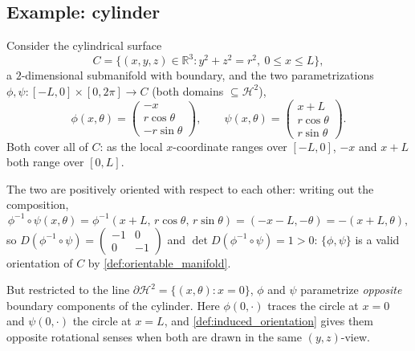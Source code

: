 \subsection{Example: cylinder}
\label{sec:cylinder_orientation_example}

Consider the cylindrical surface
\[C = \{(x,y,z) \in \mathbb{R}^3 : y^2+z^2 = r^2,\ 0\leq x\leq L\},\]
a $2$-dimensional submanifold with boundary, and the two parametrizations $\phi,\psi :
[-L,0]\times[0,2\pi] \to C$ (both domains $\subseteq \mathcal{H}^2$),
\[\phi(x,\theta) = \begin{pmatrix} -x \\ r\cos\theta \\ -r\sin\theta \end{pmatrix}, \qquad
  \psi(x,\theta) = \begin{pmatrix} x+L \\ r\cos\theta \\ r\sin\theta \end{pmatrix}.\]
Both cover all of $C$: as the local $x$-coordinate ranges over $[-L,0]$, $-x$ and $x+L$ both
range over $[0,L]$.

The two are positively oriented with respect to each other: writing out the composition,
\[\phi^{-1}\circ\psi(x,\theta) = \phi^{-1}(x+L,\,r\cos\theta,\,r\sin\theta) = (-x-L,-\theta)
  = -(x+L,\theta),\]
so $D(\phi^{-1}\circ\psi) = \begin{pmatrix}-1&0\\0&-1\end{pmatrix}$ and $\det D(\phi^{-1}
\circ\psi) = 1 > 0$: $\{\phi,\psi\}$ is a valid orientation of $C$ by
\cref{def:orientable_manifold}.

But restricted to the line $\partial\mathcal{H}^2 = \{(x,\theta) : x=0\}$, $\phi$ and $\psi$
parametrize \emph{opposite} boundary components of the cylinder. Here $\phi(0,\cdot)$ traces the
circle at $x=0$ and $\psi(0,\cdot)$ the circle at $x=L$, and \cref{def:induced_orientation}
gives them opposite rotational senses when both are drawn in the same $(y,z)$-view.

